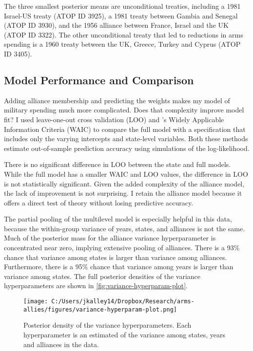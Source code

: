 \documentclass[12pt]{article}
\begin{document}
The three smallest posterior means are unconditional treaties, including a 1981 Israel-US treaty (ATOP ID 3925), a 1981 treaty between Gambia and Senegal (ATOP ID 3930),  and the 1956 alliance between France, Israel and the UK (ATOP ID 3322). The other unconditional treaty that led to reductions in arms spending is a 1960 treaty between the UK, Greece, Turkey and Cyprus (ATOP ID 3405). 


\subsection*{Model Performance and Comparison}

Adding alliance membership and predicting the weights makes my model of military spending much more complicated. Does that complexity improve model fit? I used leave-one-out cross validation (LOO) \citep{Vehtarietal2017} and \citet{Watanabe2010}'s Widely Applicable Information Criteria (WAIC) to compare the full model with a specification that includes only the varying intercepts and state-level variables. Both these methods estimate out-of-sample prediction accuracy using simulations of the log-likelihood. 

There is no significant difference in LOO between the state and full models. While the full model has a smaller WAIC and LOO values, the difference in LOO is not statistically significant. Given the added complexity of the alliance model, the lack of improvement is not surprising. I retain the alliance model because it offers a direct test of theory without losing predictive accuracy. 

The partial pooling of the multilevel model is especially helpful in this data, because the within-group variance of years, states, and alliances is not the same. Much of the posterior mass for the alliance variance hyperparameter is concentrated near zero, implying extensive pooling of alliances. There is a 93\% chance that variance among states is larger than variance among alliances. Furthermore, there is a 95\% chance that variance among years is larger than variance among states. The full posterior densities of the variance hyperparameters are shown in \autoref{fig:variance-hyperparam-plot}. 

\begin{figure}[htbp]
	\centering
		\texttt{[image: C:/Users/jkalley14/Dropbox/Research/arms-allies/figures/variance-hyperparam-plot.png]}
	\caption{Posterior density of the variance hyperparameters. Each hyperparameter is an estimated of the variance among states, years and alliances in the data.}
	\label{fig:variance-hyperparam-plot}
\end{figure}
\end{document}
